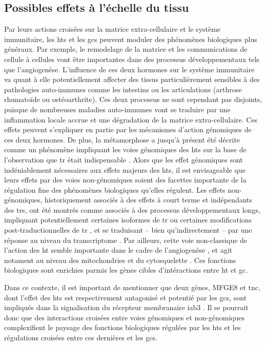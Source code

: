 \documentclass[../main.tex]{subfiles}
\begin{document}
	\subsection{Possibles effets à l’échelle du tissu}
		Par leurs actions croisées sur la matrice extra-cellulaire et le système immunitaire, les \glspl{ht} et les \glspl{gc} peuvent moduler des phénomènes biologiques plus généraux.
		Par exemple, le remodelage de la matrice et les communications de cellule à cellules vont être importantes dans des processus développementaux tels que l'angiogenèse.
		L'influence de ces deux hormones sur le système immunitaire va quant à elle potentiellement affecter des tissus particulièrement sensibles à des pathologies auto-immunes comme les intestins ou les articulations (arthrose rhumatoïde ou ostéoarthrite).
		Ces deux processus ne sont cependant pas disjoints, puisque de nombreuses maladies auto-immunes vont se traduire par une inflammation locale accrue et une dégradation de la matrice extra-cellulaire.
		Ces effets peuvent s'expliquer en partie par les mécanismes d'action génomiques de ces deux hormones.
		De plus, la métamorphose a jusqu'à présent été décrite comme un phénomène impliquant les voies génomiques des \glspl{ht} sur la base de l'observation que \gls{tr} était indispensable \citep{Das2010}.
		Alors que les effet génomiques sont indéniablement nécessaires aux effets majeurs des \glspl{ht}, il est envisageable que leurs effets par des voies non-génomiques soient des facettes importante de la régulation fine des phénomènes biologiques qu'elles régulent. 
		Les effets non-génomiques, historiquement associés à des effets à court terme et indépendants des \glspl{tr}, ont été montrés comme associés à des processus développementaux longs, impliquant potentiellement certaines isoformes de \gls{tr} ou certaines modifications post-traductionnelles de \gls{tr} \citep{Davis2005}, et se traduisant – bien qu'indirectement – par une réponse au niveau du transcriptome \citep{Davis2011}.
		Par ailleurs, cette voie non-classique de l'action des \gls{ht} semble importante dans le cadre de l'angiogenèse \citep{Bergh2005}, et agit notament au niveau des mitochondries et du cytosquelette \citep{Leonard2006,Siegrist-Kaiser1990}.
		Ces fonctions biologiques sont enrichies parmis les gènes cibles d'intéractions entre \gls{ht} et \gls{gc}.
		\par
		Dans ce contexte, il est important de mentionner que deux gènes, MFGE8 et \gls{tnc}, dont l'effet des \glspl{ht} est respectivement antagonisé et potentié par les \glspl{gc}, sont impliqués dans la signalisation du récepteur membranaire \gls{iab3} \citep{Sriramarao1993,Aziz2009}.
		Il se pourrait donc que des interactions croisées entre voies génomiques et non-génomiques complexifient le paysage des fonctions biologiques régulées par les \glspl{ht} et les régulations croisées entre ces dernières et les \glspl{gc}.
\end{document}
